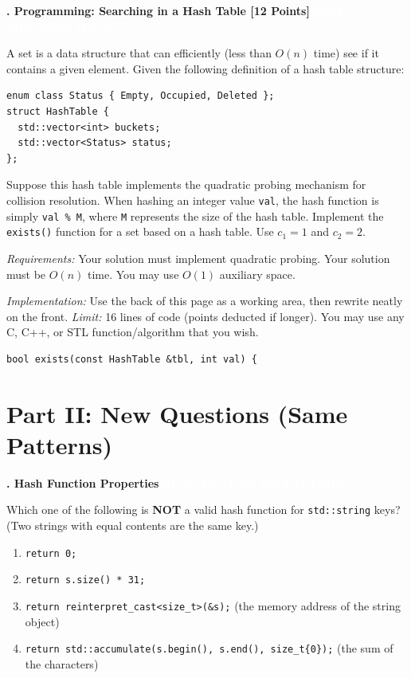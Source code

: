 \documentclass[11pt]{article}
\newcommand{\pasttag}{\colorbox{pastc}{\textcolor{white}{\scriptsize\textbf{\,PAST MIDTERM (EXACT)\,}}}}
\newcommand{\newtag}{\colorbox{newc}{\textcolor{white}{\scriptsize\textbf{\,NEW (PAST-EXAM PATTERN)\,}}}}
\newcounter{q}
\newcommand{\question}[2]{\vspace{8pt}\refstepcounter{q}\textbf{\arabic{q}. #1}\hfill #2\par}
\begin{document}
\question{Programming: Searching in a Hash Table [12 Points]}{\pasttag}
A set is a data structure that can efficiently (less than $O(n)$ time) see if it contains a given element. Given
the following definition of a hash table structure:
\begin{lstlisting}[numbers=none]
enum class Status { Empty, Occupied, Deleted };
struct HashTable {
  std::vector<int> buckets;
  std::vector<Status> status;
};
\end{lstlisting}
Suppose this hash table implements the quadratic probing mechanism for collision resolution. When
hashing an integer value \texttt{val}, the hash function is simply \texttt{val \% M}, where \texttt{M} represents the size of the
hash table. Implement the \texttt{exists()} function for a set based on a hash table. Use $c_1 = 1$ and $c_2 = 2$.

\textit{Requirements:} Your solution must implement quadratic probing. Your solution must be $O(n)$ time. You
may use $O(1)$ auxiliary space.\par \textit{Implementation:} Use the back of this page as a working area, then rewrite neatly on the front. \textit{Limit:} 16 lines of code (points deducted if longer). You may use any C, C++, or STL function/algorithm that you wish.
\begin{lstlisting}[numbers=none]
bool exists(const HashTable &tbl, int val) {
\end{lstlisting}

\section*{Part II: New Questions (Same Patterns)}

\question{Hash Function Properties}{\newtag}
Which one of the following is \textbf{NOT} a valid hash function for \texttt{std::string} keys? (Two strings with equal contents are the same key.)
\begin{enumerate}
  \item \texttt{return 0;}
  \item \texttt{return s.size() * 31;}
  \item \texttt{return reinterpret\_cast<size\_t>(\&s);} \quad (the memory address of the string object)
  \item \texttt{return std::accumulate(s.begin(), s.end(), size\_t\{0\});} \quad (the sum of the characters)
\end{enumerate}
\end{document}
